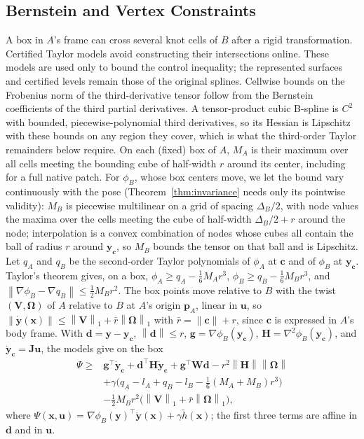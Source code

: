 \documentclass[journal]{IEEEtran}
\theoremstyle{definition}
\newcommand{\norm}[1]{\left\lVert #1\right\rVert}
\begin{document}
\subsection{Bernstein and Vertex Constraints}
A box in $A$'s frame can cross several knot cells of $B$ after a rigid transformation.
Certified Taylor models avoid constructing their intersections online. These models are used
only to bound the control inequality; the represented surfaces and certified levels remain
those of the original splines.
Cellwise bounds on the Frobenius norm of the third-derivative tensor follow from the Bernstein
coefficients of the third partial derivatives. A tensor-product cubic B-spline is $C^2$ with bounded,
piecewise-polynomial third
derivatives, so its Hessian is Lipschitz with these bounds on any region they cover, which is what the
third-order Taylor remainders below require. On each (fixed) box of $A$, $M_A$ is their maximum over
all cells meeting the bounding cube of half-width $r$ around its center, including for a full
native patch. For $\phi_B$, whose box centers move, we let the bound vary continuously with the pose (Theorem~\ref{thm:invariance} needs only its pointwise validity):
$M_B$ is piecewise multilinear on a grid of spacing $\Delta_B/2$, with node values the maxima over the cells meeting
the cube of half-width $\Delta_B/2+r$ around the node; interpolation is a convex combination of nodes whose
cubes all contain the ball of radius $r$ around $\mathbf y_{\mathbf c}$, so $M_B$ bounds the tensor on
that ball and is Lipschitz. Let $q_A$ and $q_B$ be the second-order Taylor polynomials of
$\phi_A$ at $\mathbf c$ and of $\phi_B$ at $\mathbf y_{\mathbf c}$. Taylor's theorem gives, on a box,
$\phi_A\ge q_A-\tfrac16M_Ar^3$, $\phi_B\ge q_B-\tfrac16M_Br^3$, and
$\norm{\nabla\phi_B-\nabla q_B}\le\tfrac12M_Br^2$. The box points move relative to $B$ with the twist
$(\mathbf V,\boldsymbol\Omega)$ of $A$ relative to $B$ at $A$'s origin $\mathbf p_A$, linear in $\mathbf u$,
so $\norm{\dot{\mathbf y}(\mathbf x)}\le\norm{\mathbf V}_1+\bar r\norm{\boldsymbol\Omega}_1$ with
$\bar r=\norm{\mathbf c}+r$, since $\mathbf c$ is expressed in $A$'s body frame.
With $\mathbf d=\mathbf y-\mathbf y_{\mathbf c}$, $\norm{\mathbf d}\le r$,
$\mathbf g=\nabla\phi_B(\mathbf y_{\mathbf c})$, $\mathbf H=\nabla^2\phi_B(\mathbf y_{\mathbf c})$, and
$\dot{\mathbf y}_{\mathbf c}=\mathbf J\mathbf u$, the models give on the box
\begin{equation}\label{eq:psi-lb}
\begin{aligned}
\Psi\ge{}&\mathbf g^\top\dot{\mathbf y}_{\mathbf c}+\mathbf d^\top\mathbf H\dot{\mathbf y}_{\mathbf c}
+\mathbf g^\top\mathbf W\mathbf d-r^2\norm{\mathbf H}\norm{\boldsymbol\Omega}\\
&+\gamma\big(q_A-l_A+q_B-l_B-\tfrac16(M_A+M_B)r^3\big)\\
&-\tfrac12M_Br^2\big(\norm{\mathbf V}_1+\bar r\norm{\boldsymbol\Omega}_1\big),
\end{aligned}
\end{equation}
where $\Psi(\mathbf x,\mathbf u)=\nabla\phi_B(\mathbf y)^\top\dot{\mathbf y}(\mathbf x)+\gamma\tilde h(\mathbf x)$;
the first three terms are affine in $\mathbf d$ and in $\mathbf u$.
\end{document}
